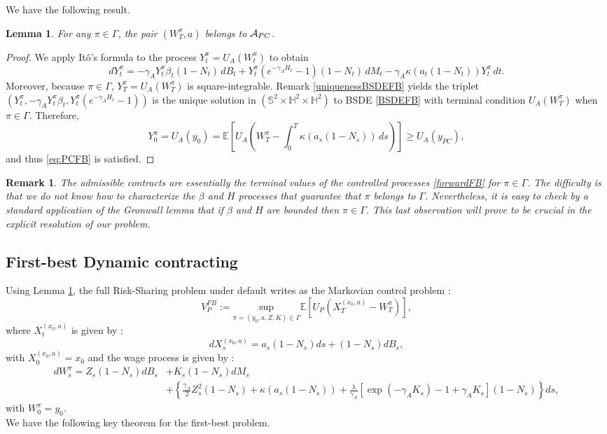 \documentclass[numbook, envcountsect, envcountsame, envcountreset, runningheads, smallextended]{article}
\newtheorem{Lemma}{Lemma}[part]
\newtheorem{Remark}{Remark}[part]
\def \E{\mathbb{E}}
\def\Ac{{\cal A}}
\begin{document}
We have the following result.
\begin{Lemma}
\label{lemma:main1PB}
For any $\pi \in \Gamma$, the pair $(W_T^\pi,a)$ belongs to $\Ac_{PC}$.
\end{Lemma}
\begin{proof}
We apply It\^o’s formula to the process $Y_t^\pi=U_A(W_t^\pi)$ to obtain
$$
dY_t^\pi=-\gamma_A Y_t^\pi \beta_t(1-N_t) \,dB_t +Y_t^\pi\left( e^{-\gamma_AH_t}-1\right)(1-N_t)\,dM_t-\gamma_A\kappa(a_t(1-N_t))Y_t^\pi\,dt.
$$
Moreover, because $\pi \in \Gamma$, $Y_T^\pi=U_A(W_T^\pi)$ is square-integrable. Remark \ref{uniquenessBSDEFB} yields the triplet $\left(Y_t^\pi,-\gamma_AY_t^\pi\beta_t, Y_t^\pi ( e^{-\gamma_AH_t}-1)\right)$ is the unique solution 
in $(\mathbb{S}^2\times\mathbb{H}^2\times \mathbb{H}^2)$ to BSDE \eqref{BSDEFB} with terminal condition $U_A(W_T^\pi)$ when $\pi \in \Gamma$. Therefore,
$$
Y_0^\pi=U_A(y_0)=\E\left[ U_A\left(W_T^\pi-\int_0^T \kappa(a_s(1-N_s))\,ds\right)\right]\ge U_A(y_{PC}),
$$
and thus \eqref{eq:PCFB} is satisfied.
\end{proof}

\begin{Remark} \label{boundedcontrol}
The admissible contracts are essentially the terminal values of the controlled processes \eqref{forwardFB} for $\pi \in \Gamma$. The difficulty is that we do not know how to characterize the $\beta$ and $H$ processes that guarantee that $\pi$ belongs to  $\Gamma$. Nevertheless, it is easy to check by a standard application of the Gronwall lemma that if $\beta$ and $H$ are bounded then $\pi \in \Gamma$. This last observation will prove to be crucial in the explicit resolution of our problem.
\end{Remark}




\subsection{First-best Dynamic contracting}

Using Lemma \ref{lemma:main1PB}, the full Risk-Sharing problem under default writes as the Markovian control problem : 
 \begin{equation}
 \label{eq:pbparam}
V_P^{FB}:= \underset{\pi=(y_0, a,Z,K) \in \Gamma}{\text{sup}}\E\left[ U_P\left(X_T^{(x_0,a)} - W_T^{\pi}\right)\right],
 \end{equation}
 where  $X_t^{(x_0,a)}$ is given by :
 $$ dX^{(x_0,a)}_s =  a_s(1-N_s) ds +  (1-N_s) dB_s,$$ 
 with $X_0^{(x_0,a)}=x_0$
and the wage process is given by :
 \begin{align*}
 \label{eq:wageparam}
 dW_s^{\pi} =  Z_s (1-N_s)dB_s &+ K_s (1-N_s)dM_s \\
 &+  \left\{ \frac{\gamma_A}{2} Z_s^2 (1-N_s)+ \kappa(a_s(1-N_s)) + \frac{\lambda}{\gamma_A} [\exp(-\gamma_A K_s) - 1 + \gamma_A K_s ](1-N_s)\right\} ds,
 \end{align*}
 with $W_0^{\pi}=y_0$.\\
 We have the following key theorem for the first-best problem. 
 
\end{document}
